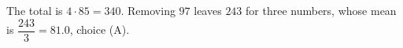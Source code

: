 The total is $4\cdot85=340$. Removing $97$ leaves $243$ for three numbers, whose mean is $\dfrac{243}{3}=\boxed{81.0}$, choice (A).
